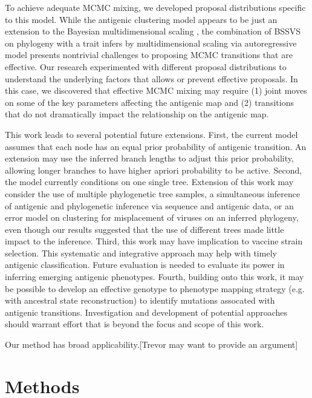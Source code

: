 \documentclass[11pt,oneside,letterpaper]{article}
\begin{document}
To achieve adequate MCMC mixing, we developed proposal distributions specific to this model. 
While the antigenic clustering model appears to be just an extension to the Bayesian multidimensional scaling \cite{bedford_integrating_2014}, the combination of BSSVS on phylogeny with a trait infers by multidimensional scaling via autoregressive model presents nontrivial challenges to proposing MCMC transitions that are effective. 
Our research experimented with different proposal distributions to understand the underlying factors that allows or prevent effective proposals. 
In this case, we discovered that effective MCMC mixing may require (1) joint moves on some of the key parameters affecting the antigenic map and (2) transitions that do not dramatically impact the relationship on the antigenic map.


This work leads to several potential future extensions. 
First, the current model assumes that each node has an equal prior probability of antigenic transition. 
An extension may use the inferred branch lengths to adjust this prior probability, allowing longer branches to have higher apriori probability to be active.
Second, the model currently conditions on one single tree. 
Extension of this work may consider the use of multiple phylogenetic tree samples, a simultaneous inference of antigenic and phylogenetic inference via sequence and antigenic data, or  an error model on clustering for misplacement of viruses on an inferred phylogeny, even though our results suggested that the use of different trees made little impact to the inference. 
Third, this work may have implication to vaccine strain selection. 
This systematic and integrative approach may help with timely antigenic classification. 
Future evaluation is needed to evaluate its power in inferring emerging antigenic phenotypes. 
Fourth, building onto this work, it may be possible to develop an effective genotype to phenotype mapping strategy (e.g. with ancestral state reconstruction) to identify mutations assocated with antigenic transitions. 
Investigation and development of potential approaches should warrant effort that is beyond the focus and scope of this work.



Our method has broad applicability.[Trevor may want to provide an argument]



\newpage




\section*{Methods}
\end{document}
